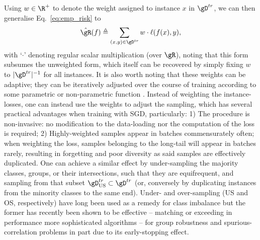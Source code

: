Using \( w \in \R^+ \) to denote the weight assigned to instance \(x\) in \( \gD^{tr} \), we can
then generalise Eq.~\ref{eq:emp_risk} to
\begin{equation*} \label{eq:emp_risk_weighted} \hat{\gR}(f) \triangleq \sum_{(x, y) \in \gD^{tr}} w
\cdot \ell (f(x), y), \end{equation*}
with `\( \cdot \)' denoting regular scalar multiplication (over \(\gR\)), noting that this form
subsumes the unweighted form, which itself can be recovered by simply fixing \(w\) to \(
|\gD^{tr}|^{-1} \) for all instances.
%
It is also worth noting that these weights can be adaptive; they can be iteratively adjusted over
the course of training according to some parametric or non-parametric function
\citep{wang2021importance}.
%
Instead of weighting the instance-losses, one can instead use the weights to adjust the sampling,
which has several practical advantages when training with \ac{SGD}, particularly: 
1) The procedure is non-invasive: no modification to the data-loading nor the computation of the
loss is required;
%
2) Highly-weighted samples appear in batches commensurately often; when weighting the loss, samples
belonging to the long-tail will appear in batches rarely, resulting in forgetting and poor
diversity as said samples are effectively duplicated.
One can achieve a similar effect by under-sampling the majority classes, groups, or their
intersections, such that they are equifrequent, and \iid{} sampling from that subset \(
\gD^{tr}_{\text{US}} \subset \gD^{tr} \) (or, conversely by duplicating instances from the minority
classes to the same end).
Under- and over-sampling (US and OS, respectively) have long been used as a remedy for class
imbalance \citep{chawla2002smote} but the former has recently been shown to be effective --
matching or exceeding in performance more sophisticated algorithms -- for group robustness and
spurious-correlation problems \citep{sagawa2020investigation, idrissi2022simple} in part due to its
early-stopping effect.

